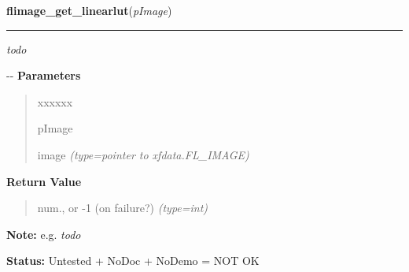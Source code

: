 \hspace{.8\funcindent}\begin{boxedminipage}{\funcwidth}

    \raggedright \textbf{flimage\_get\_linearlut}(\textit{pImage})

    \vspace{-1.5ex}

    \rule{\textwidth}{0.5\fboxrule}
\setlength{\parskip}{2ex}

\emph{todo}

-{}-
\setlength{\parskip}{1ex}
      \textbf{Parameters}
      \vspace{-1ex}

      \begin{quote}
        \begin{Ventry}{xxxxxx}

          \item[pImage]


image
            {\it (type=pointer to xfdata.FL\_IMAGE)}

        \end{Ventry}

      \end{quote}

      \textbf{Return Value}
    \vspace{-1ex}

      \begin{quote}

num., or -1 (on failure?)
      {\it (type=int)}

      \end{quote}

\textbf{Note:} 
e.g. \emph{todo}


\textbf{Status:} 
Untested + NoDoc + NoDemo = NOT OK


    \end{boxedminipage}

    \label{xformslib:flflimage:flimage_invalidate_pixels}

    \vspace{0.5ex}

